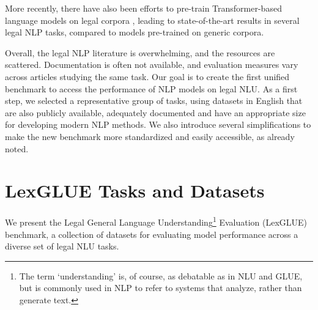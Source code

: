 \documentclass[11pt]{article}
\begin{document}
More recently, there have also been  efforts to pre-train Transformer-based language models on legal corpora \cite{chalkidis-etal-2020-legalbert,zhengguha2021,xiao-etal-2021}, leading to state-of-the-art results in several legal NLP tasks, compared to models pre-trained on generic corpora.

Overall, the legal NLP literature is overwhelming, and the resources are scattered.
Documentation is often not available, and evaluation measures vary across articles studying the same task. Our goal is to create the first unified benchmark to access the performance of NLP models on legal NLU. As a first step, we selected a representative group of tasks, using datasets in English that are also publicly available, adequately documented and have an appropriate size for developing modern NLP methods. We also introduce several simplifications to make the new benchmark more standardized and easily accessible, as already noted.


\section{LexGLUE Tasks and Datasets}
\label{sec:TasksAndDatasets}

We present the Legal General Language Understanding\footnote{The term `understanding' is, of course, as debatable as in NLU and GLUE, but is commonly used in NLP to refer to systems that analyze, rather than generate text.} Evaluation (LexGLUE) benchmark, a collection of datasets for evaluating model performance across a diverse set of legal NLU tasks.
\end{document}
